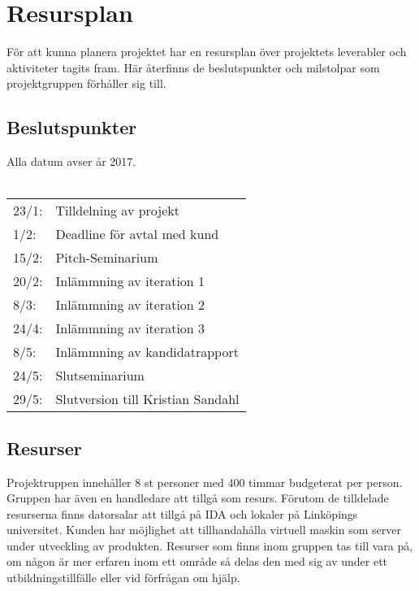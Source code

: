 \section{Resursplan}
För att kunna planera projektet har en resursplan över projektets leverabler och aktiviteter tagits fram. Här återfinns de beslutspunkter och milstolpar som projektgruppen förhåller sig till.
\subsection{Beslutspunkter} %

	Alla datum avser år 2017.\\
	\\
	\begin{tabular}{l l}
	23/1: &	Tilldelning av projekt \\
	1/2:  & Deadline för avtal med kund \\
	15/2: & Pitch-Seminarium \\
	20/2: & Inlämmning av iteration 1 \\
	8/3:  & Inlämmning av iteration 2 \\
	24/4: & Inlämmning av iteration 3 \\
	8/5:  & Inlämmning av kandidatrapport \\
	24/5: & Slutseminarium \\
	29/5: & Slutversion till Kristian Sandahl \\
	\end{tabular}	


\subsection{Resurser}%
Projektruppen innehåller 8 st personer med 400 timmar budgeterat per person. Gruppen har även en handledare att tillgå som resurs. Förutom de tilldelade resurserna finns datorsalar att tillgå på IDA och lokaler på Linköpings universitet. Kunden har möjlighet att tillhandahålla virtuell maskin som server under utveckling av produkten. Resurser som finns inom gruppen tas till vara på, om någon är mer erfaren inom ett område så delas den med sig av under ett utbildningstillfälle eller vid förfrågan om hjälp.\\
\newpage